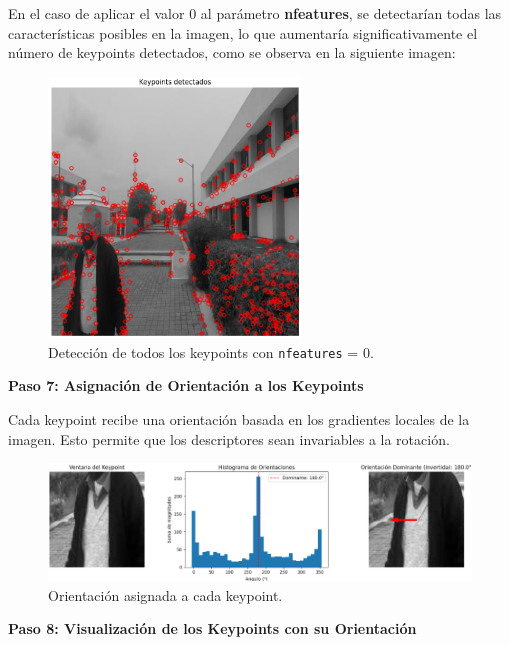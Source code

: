 \documentclass[a4paper]{article}
\begin{document}
En el caso de aplicar el valor 0 al parámetro \textbf{nfeatures}, se detectarían todas las características posibles en la imagen, lo que aumentaría significativamente el número de keypoints detectados, como se observa en la siguiente imagen:

\begin{figure}[H]
    \centering
    \includegraphics[width=0.6\textwidth]{images/sift_paso_5.png}
    \caption{Detección de todos los keypoints con \texttt{nfeatures} = 0.}
\end{figure}

\textbf{Paso 7: Asignación de Orientación a los Keypoints}
\par\vspace{0.5cm}

Cada keypoint recibe una orientación basada en los gradientes locales de la imagen. Esto permite que los descriptores sean invariables a la rotación.

\begin{figure}[H]
    \centering
    \includegraphics[width=1.1\textwidth]{images/sift_paso_6.1.png}
    \caption{Orientación asignada a cada keypoint.}
\end{figure}

\textbf{Paso 8: Visualización de los Keypoints con su Orientación}
\par\vspace{0.5cm}
\end{document}
